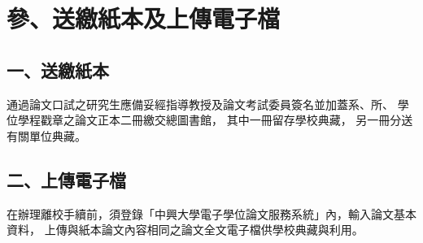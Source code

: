 \chapter{參、送繳紙本及上傳電子檔}
\section{一、送繳紙本}
通過論文口試之研究生應備妥經指導教授及論文考試委員簽名並加蓋系、所、
學位學程戳章之論文正本二冊繳交總圖書館，
其中一冊留存學校典藏，
另一冊分送有關單位典藏。

\section{二、上傳電子檔}
在辦理離校手續前，須登錄「中興大學電子學位論文服務系統」內，輸入論文基本資料，
上傳與紙本論文內容相同之論文全文電子檔供學校典藏與利用。
